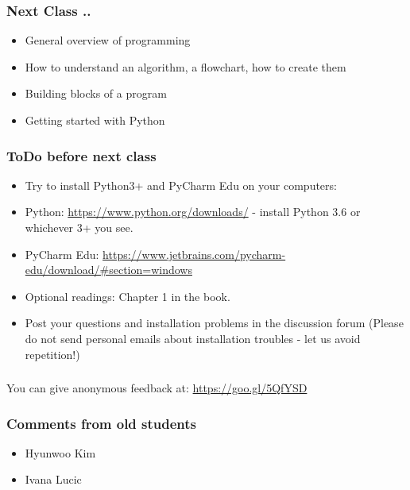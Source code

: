 \documentclass{beamer}
\begin{document}
\begin{frame}
\frametitle{Next Class ..} %
\begin{itemize}
\item General overview of programming
\item How to understand an algorithm, a flowchart, how to create them
\item Building blocks of a program %
\item Getting started with Python
\end{itemize}
\end{frame}

\begin{frame}
\frametitle{ToDo before next class} %
\begin{itemize}
\item Try to install Python3+ and PyCharm Edu on your computers:
\item Python: \url{https://www.python.org/downloads/} - install Python 3.6 or whichever 3+ you see.
\item PyCharm Edu: \url{https://www.jetbrains.com/pycharm-edu/download/\#section=windows}
\item Optional readings: Chapter 1 in the book. 
\item Post your questions and installation problems in the discussion forum (Please do not send personal emails about installation troubles - let us avoid repetition!)
\end{itemize}\end{frame}


\begin{frame}
\frametitle{}
\begin{center}
You can give anonymous feedback at: \url{https://goo.gl/5QfYSD}
\end{center}
\end{frame}

\begin{frame}
\frametitle{Comments from old students}
\begin{itemize}
\item Hyunwoo Kim
\item Ivana Lucic %
\end{itemize}
\end{frame}
\end{document}
